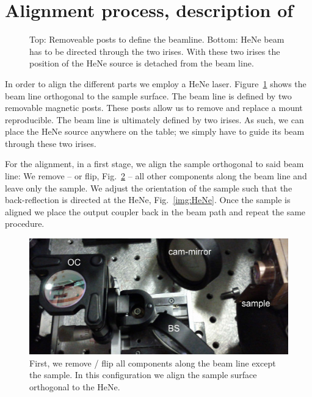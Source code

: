 \section{Alignment process, description of}
\label{app:alignment}

\begin{figure}
\centering
{}
\caption{Top: Removeable posts to define the beamline.
Bottom: HeNe beam has to be directed through the two irises.
With these two irises the position of the HeNe source is detached from the beam line.}
\label{img:beamline}
\end{figure}

In order to align the different parts we employ a HeNe laser.
Figure~\ref{img:beamline} shows the beam line orthogonal to the sample surface.
The beam line is defined by two removable magnetic posts.
These posts allow us to remove and replace a mount reproducible.
The beam line is ultimately defined by two irises.
As such, we can place the HeNe source anywhere on the table;
we simply have to guide its beam through these two irises.

For the alignment,
in a first stage,
we align the sample orthogonal to said beam line:
We remove -- or flip, Fig.~\ref{img:cavity_flipped} --
all other components along the beam line
and leave only the sample.
We adjust the orientation of the sample such that
the back-reflection is directed at the HeNe, Fig.~\ref{img:HeNe}.
Once the sample is aligned
we place the output coupler
back in the beam path
and repeat the same procedure.

\begin{figure}
\centering
\includegraphics[width=12.5cm]{img/appendix/cavity_flipped.jpg}
\caption{First, we remove / flip all components along the beam line except the sample.
In this configuration we align the sample surface orthogonal to the HeNe.}
\label{img:cavity_flipped}
\end{figure}

